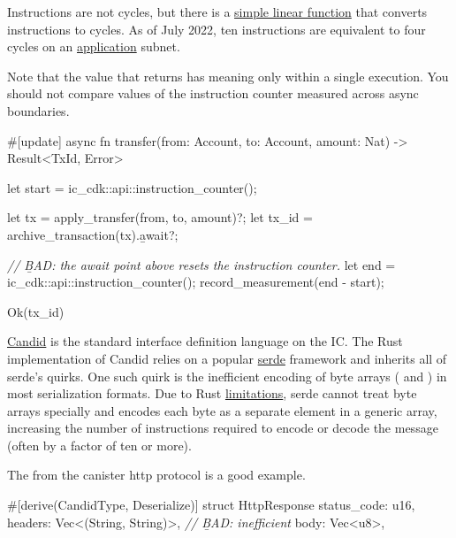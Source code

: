 \documentclass{article}
\begin{document}
Instructions are not cycles, but there is a \href{https://github.com/dfinity/ic/blob/c01d7d1b2e18490a2f70d2fdf5b6aceccab5860c/rs/cycles_account_manager/src/lib.rs#L730-L738}{simple linear function} that converts instructions to cycles.
As of July 2022, ten instructions are equivalent to four cycles on an \href{https://github.com/dfinity/ic/blob/7d3fb4ef01416241205818450156aabd21c24b34/rs/config/src/subnet_config.rs#L288-L289}{application} subnet.

Note that the value that  returns has meaning only within a single execution.
You should not compare values of the instruction counter measured across async boundaries.

\begin{code}[bad]
#[update]
async fn transfer(from: Account, to: Account, amount: Nat) -> Result<TxId, Error> {
  let start = ic_cdk::api::instruction_counter();

  let tx = apply_transfer(from, to, amount)?;
  let tx_id = archive_transaction(tx).\b{await}?;

  \emph{// \b{BAD}: the await point above resets the instruction counter.}
  let end = ic_cdk::api::instruction_counter();
  record_measurement(end - start);

  Ok(tx_id)
}
\end{code}


\href{https://github.com/dfinity/candid}{Candid} is the standard interface definition language on the IC.
The Rust implementation of Candid relies on a popular \href{https://serde.rs/}{serde} framework and inherits all of serde's quirks.
One such quirk is the inefficient encoding of byte arrays ( and \code{[u8]}) in most serialization formats.
Due to Rust \href{https://rust-lang.github.io/rfcs/1210-impl-specialization.html}{limitations}, serde cannot treat byte arrays specially and encodes each byte as a separate element in a generic array, increasing the number of instructions required to encode or decode the message (often by a factor of ten or more).

The  from the canister http protocol is a good example.

\begin{code}[bad]
#[derive(CandidType, Deserialize)]
struct HttpResponse {
    status_code: u16,
    headers: Vec<(String, String)>,
    \emph{// \b{BAD}: inefficient}
    body: Vec<u8>,
}
\end{code}
\end{document}
